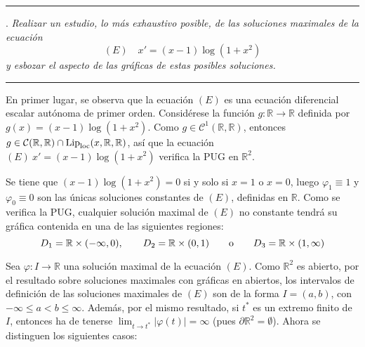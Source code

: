 \documentclass[11pt]{report}
\newcommand{\R}{\mathbb R}
\begin{document}
\vspace{2mm}

\hrule

\vspace{4mm}

. \textit{Realizar un estudio, lo más exhaustivo posible, de las soluciones maximales de la ecuación}
\[(E) \quad x'=(x-1)\log(1+x^2)\]
\textit{y esbozar el aspecto de las gráficas de estas posibles soluciones.}

\vspace{4mm}

\hrule

\vspace{4mm}

En primer lugar, se observa que la ecuación $(E)$ es una ecuación diferencial escalar autónoma de primer orden. Considérese la función $g \colon \R \to \R$ definida por $g(x)=(x-1)\log(1+x^2)$. Como $g \in \mathcal{C}^1(\R,\R)$, entonces $g \in \mathcal{C}(\R,\R) \cap \textup{Lip}_{\textup{loc}}(x,\R,\R)$, así que la ecuación $(E) \ x'=(x-1)\log(1+x^2)$ verifica la PUG en $\R^2$.

\vspace{2mm}

Se tiene que $(x-1)\log(1+x^2)=0$ si y solo si $x=1$ o $x=0$, luego $\varphi_1 \equiv 1$ y $\varphi_0 \equiv 0$ son las únicas soluciones constantes de $(E)$, definidas en $\R$. Como se verifica la PUG, cualquier solución maximal de $(E)$ no constante tendrá su gráfica contenida en una de las siguientes regiones:
\[D_1= \R \times (-\infty,0), \qquad D_2 = \R \times (0,1) \qquad \textup{o} \qquad D_3 = \R \times (1,\infty)\]

\vspace{2mm}

Sea $\varphi \colon I \to \R$ una solución maximal de la ecuación $(E)$. Como $\R^2$ es abierto, por el resultado sobre soluciones maximales con gráficas en abiertos, los intervalos de definición de las soluciones maximales de $(E)$ son de la forma $I = (a,b)$, con $-\infty \leq a < b \leq \infty$. Además, por el mismo resultado, si $t^*$ es un extremo finito de $I$, entonces ha de tenerse $\lim_{t \to t^*} |\varphi(t)| = \infty$ (pues $\partial \R^2 = \emptyset$). Ahora se distinguen los siguientes casos:
\end{document}
